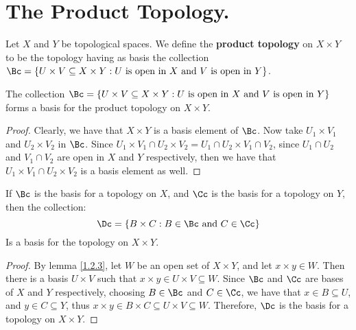 
\section{The Product Topology.}

\begin{definition}
    Let $X$ and $Y$ be topological spaces. We define the \textbf{product topology} on 
    $X \times Y$ to be the topology having as basis the collection  $\Bc=\{U \times V \subseteq X \times Y:
    U \text{ is open in } X \text{ and } V \text{ is open in } Y\}$.
\end{definition}

\begin{theorem}\label{1.4.1}
    The collection $\Bc=\{U \times V \subseteq X \times Y: U \text{ is open in } X \text{ and } V 
    \text{ is open in } Y\}$ forms a basis for the product topology on $X \times Y$.
\end{theorem}
\begin{proof}
    Clearly, we have that $X \times Y$ is a basis element of  $\Bc$. Now take  $U_1 \times V_1$ 
    and $U_2 \times V_2$ in $\Bc$. Since  $U_1 \times V_1 \cap U_2 \times V_2=U_1 \cap U_2 \times V_1 \cap V_2$, 
    since $U_1 \cap U_2$ and $V_1 \cap V_2$ are open in $X$ and  $Y$ respectively, then 
    we have that $U_1 \times V_1 \cap U_2 \times V_2$ is a basis element as well.
\end{proof}

\begin{theorem}\label{1.4.2}
    If $\Bc$ is the basis for a topology on  $X$, and  $\Cc$ is the basis for a 
    topology on  $Y$, then the collection:
        \begin{equation*}
            \Dc=\{B \times C: B \in \Bc \text{ and } C \in \Cc\}
        \end{equation*}
    Is a basis for the topology on $X \times Y$.
\end{theorem}
\begin{proof}
    By lemma \ref{1.2.3}, let $W$ be an open set of  $X \times Y$, and let  $x \times y \in W$. 
    Then there is a basis  $U \times V$ such that  $x \times y \in U \times V \subseteq W$. Since  $\Bc$ 
    and  $\Cc$ are bases of  $X$ and  $Y$ respectively, choosing  $B \in \Bc$ and  $C \in \Cc$, 
    we have that  $x \in B \subseteq U$, and  $y \in C \subseteq Y$, thus  $x \times y \in B \times C \subseteq U \times V \subseteq W$. 
    Therefore, $\Dc$ is the basis for a topology on  $X \times Y$.
\end{proof}


